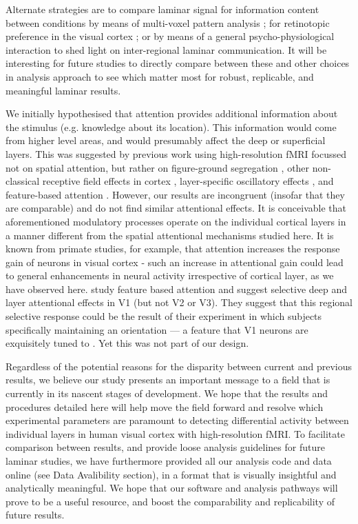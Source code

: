 \documentclass[9pt,lineno]{aperture}
\begin{document}
Alternate strategies are to compare laminar signal for information content between conditions by means of multi-voxel pattern analysis \citet{Muckli2015}; for retinotopic preference in the visual cortex \citep{Klein2018}; or by means of a general psycho-physiological interaction \citep{Sharoh2019} to shed light on inter-regional laminar communication. It will be interesting for future studies to directly compare between these and other choices in analysis approach to see which matter most for robust, replicable, and meaningful laminar results. 

We initially hypothesised that attention provides additional information about the stimulus (e.g. knowledge about its location). This information would come from higher level areas, and would presumably affect the deep or superficial layers. This was suggested by previous work using high-resolution fMRI focussed not on spatial attention, but rather on figure-ground segregation \citep{Kok2016}, other non-classical receptive field effects in cortex \citep{Muckli2015}, layer-specific oscillatory effects \citep{Scheeringa2016}, and feature-based attention \citep{Lawrence2018}. However, our results are incongruent (insofar that they are comparable) and do not find similar attentional effects. It is conceivable that aforementioned modulatory processes operate on the individual cortical layers in a manner different from the spatial attentional mechanisms studied here. It is known from primate studies, for example, that attention increases the response gain of neurons in visual cortex \citep{Treue1999,MartinezTrujillo2004} - such an increase in attentional gain could lead to general enhancements in neural activity irrespective of cortical layer, as we have observed here. \citet{Lawrence2018} study feature based attention and suggest selective deep and layer attentional effects in V1 (but not V2 or V3). They suggest that this regional selective response could be the result of their experiment in which subjects specifically maintaining an orientation — a feature that V1 neurons are exquisitely tuned to \citep{Hubel1968}. Yet this was not part of our design.

Regardless of the potential reasons for the disparity between current and previous results, we believe our study presents an important message to a field that is currently in its nascent stages of development. We hope that the results and procedures detailed here will help move the field forward and resolve which experimental parameters are paramount to detecting differential activity between individual layers in human visual cortex with high-resolution fMRI. To facilitate comparison between results, and provide loose analysis guidelines for future laminar studies, we have furthermore provided all our analysis code and data online (see Data Avalibility section), in a format that is visually insightful and analytically meaningful. We hope that our software and analysis pathways will prove to be a useful resource, and boost the comparability and replicability of future results. 
\end{document}
